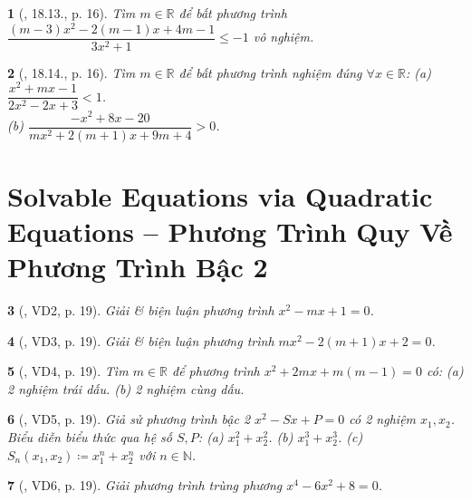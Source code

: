 \documentclass{article}
\newtheorem{baitoan}{}
\begin{document}
\begin{baitoan}[\cite{Hai_Hung_Thu_Tung_ncpt_Toan_10_tap_2}, 18.13., p. 16]
	Tìm $m\in\mathbb{R}$ để bất phương trình $\dfrac{(m - 3)x^2 - 2(m - 1)x + 4m - 1}{3x^2 + 1}\le-1$ vô nghiệm.
\end{baitoan}

\begin{baitoan}[\cite{Hai_Hung_Thu_Tung_ncpt_Toan_10_tap_2}, 18.14., p. 16]
	Tìm $m\in\mathbb{R}$ để bất phương trình nghiệm đúng $\forall x\in\mathbb{R}$: (a) $\dfrac{x^2 + mx - 1}{2x^2 - 2x + 3} < 1$.\\(b) $\dfrac{-x^2 + 8x - 20}{mx^2 + 2(m + 1)x + 9m + 4} > 0$.
\end{baitoan}


\section{Solvable Equations via Quadratic Equations -- Phương Trình Quy Về Phương Trình Bậc 2}

\begin{baitoan}[\cite{Hai_Hung_Thu_Tung_ncpt_Toan_10_tap_2}, VD2, p. 19]
	Giải \& biện luận phương trình $x^2 - mx + 1 = 0$.
\end{baitoan}

\begin{baitoan}[\cite{Hai_Hung_Thu_Tung_ncpt_Toan_10_tap_2}, VD3, p. 19]
	Giải \& biện luận phương trình $mx^2 - 2(m + 1)x + 2 = 0$.
\end{baitoan}

\begin{baitoan}[\cite{Hai_Hung_Thu_Tung_ncpt_Toan_10_tap_2}, VD4, p. 19]
	Tìm $m\in\mathbb{R}$ để phương trình $x^2 + 2mx + m(m - 1) = 0$ có: (a) 2 nghiệm trái dấu. (b) 2 nghiệm cùng dấu.
\end{baitoan}

\begin{baitoan}[\cite{Hai_Hung_Thu_Tung_ncpt_Toan_10_tap_2}, VD5, p. 19]
	Giả sử phương trình bậc 2 $x^2 - Sx + P = 0$ có 2 nghiệm $x_1,x_2$. Biểu diễn biểu thức qua hệ số $S,P$: (a) $x_1^2 + x_2^2$. (b) $x_1^3 + x_2^3$. (c) $S_n(x_1,x_2)\coloneqq x_1^n + x_2^n$ với $n\in\mathbb{N}$.
\end{baitoan}

\begin{baitoan}[\cite{Hai_Hung_Thu_Tung_ncpt_Toan_10_tap_2}, VD6, p. 19]
	Giải phương trình trùng phương $x^4 - 6x^2 + 8 = 0$.
\end{baitoan}
\end{document}
